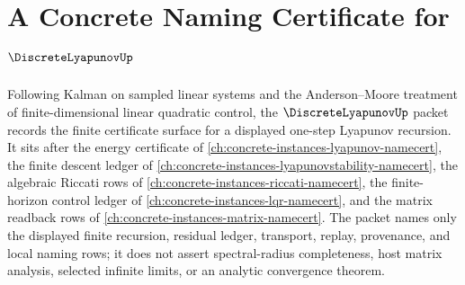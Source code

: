 \chapter{A Concrete Naming Certificate for $\DiscreteLyapunovUp$}
\label{ch:concrete-instances-discrete-lyapunov-namecert}

Following Kalman on sampled linear systems and the Anderson--Moore treatment of finite-dimensional linear quadratic control, the $\DiscreteLyapunovUp$ packet records the finite certificate surface for a displayed one-step Lyapunov recursion. It sits after the energy certificate of \autoref{ch:concrete-instances-lyapunov-namecert}, the finite descent ledger of \autoref{ch:concrete-instances-lyapunovstability-namecert}, the algebraic Riccati rows of \autoref{ch:concrete-instances-riccati-namecert}, the finite-horizon control ledger of \autoref{ch:concrete-instances-lqr-namecert}, and the matrix readback rows of \autoref{ch:concrete-instances-matrix-namecert}. The packet names only the displayed finite recursion, residual ledger, transport, replay, provenance, and local naming rows; it does not assert spectral-radius completeness, host matrix analysis, selected infinite limits, or an analytic convergence theorem.

